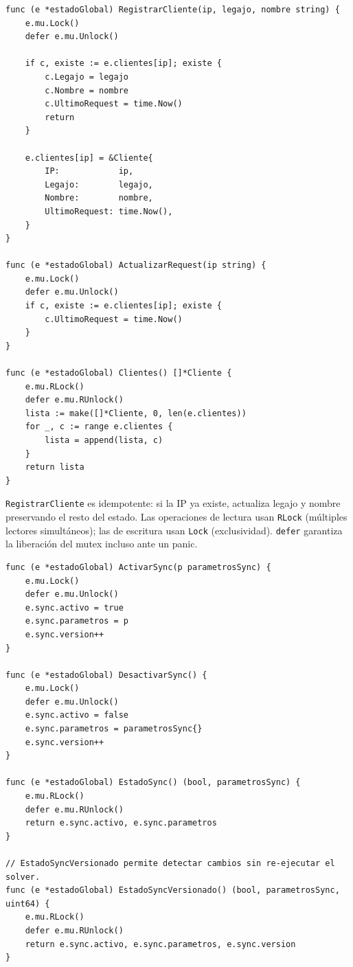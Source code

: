 \documentclass[12pt, a4paper]{article}
\begin{document}
\begin{lstlisting}[style=golang, caption={Registro y consulta de clientes}]
func (e *estadoGlobal) RegistrarCliente(ip, legajo, nombre string) {
    e.mu.Lock()
    defer e.mu.Unlock()

    if c, existe := e.clientes[ip]; existe {
        c.Legajo = legajo
        c.Nombre = nombre
        c.UltimoRequest = time.Now()
        return
    }

    e.clientes[ip] = &Cliente{
        IP:            ip,
        Legajo:        legajo,
        Nombre:        nombre,
        UltimoRequest: time.Now(),
    }
}

func (e *estadoGlobal) ActualizarRequest(ip string) {
    e.mu.Lock()
    defer e.mu.Unlock()
    if c, existe := e.clientes[ip]; existe {
        c.UltimoRequest = time.Now()
    }
}

func (e *estadoGlobal) Clientes() []*Cliente {
    e.mu.RLock()
    defer e.mu.RUnlock()
    lista := make([]*Cliente, 0, len(e.clientes))
    for _, c := range e.clientes {
        lista = append(lista, c)
    }
    return lista
}
\end{lstlisting}

\texttt{RegistrarCliente} es idempotente: si la IP ya existe, actualiza legajo y nombre
preservando el resto del estado. Las operaciones de lectura usan \texttt{RLock}
(múltiples lectores simultáneos); las de escritura usan \texttt{Lock} (exclusividad).
\texttt{defer} garantiza la liberación del mutex incluso ante un panic.

\begin{lstlisting}[style=golang, caption={Control de sincronizacion}]
func (e *estadoGlobal) ActivarSync(p parametrosSync) {
    e.mu.Lock()
    defer e.mu.Unlock()
    e.sync.activo = true
    e.sync.parametros = p
    e.sync.version++
}

func (e *estadoGlobal) DesactivarSync() {
    e.mu.Lock()
    defer e.mu.Unlock()
    e.sync.activo = false
    e.sync.parametros = parametrosSync{}
    e.sync.version++
}

func (e *estadoGlobal) EstadoSync() (bool, parametrosSync) {
    e.mu.RLock()
    defer e.mu.RUnlock()
    return e.sync.activo, e.sync.parametros
}

// EstadoSyncVersionado permite detectar cambios sin re-ejecutar el solver.
func (e *estadoGlobal) EstadoSyncVersionado() (bool, parametrosSync, uint64) {
    e.mu.RLock()
    defer e.mu.RUnlock()
    return e.sync.activo, e.sync.parametros, e.sync.version
}
\end{lstlisting}
\end{document}
